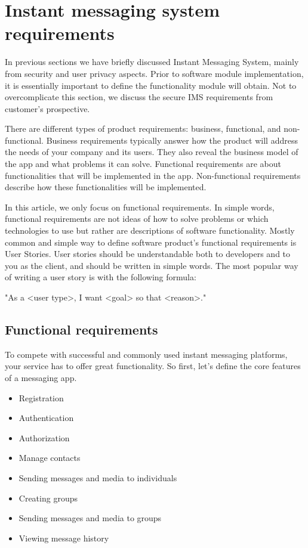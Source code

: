 \chapter{Instant messaging system requirements}\label{ch:instant-messaging-system-requirements}

In previous sections we have briefly discussed Instant Messaging System, mainly from security and user privacy aspects.
Prior to software module implementation, it is essentially important to define the functionality module will obtain.
Not to overcomplicate this section, we discuss the secure IMS requirements from customer's prospective.

There are different types of product requirements: business, functional, and non-functional.
Business requirements typically answer how the product will address the needs of your company and its users.
They also reveal the business model of the app and what problems it can solve.
Functional requirements are about functionalities that will be implemented in the app.
Non-functional requirements describe how these functionalities will be implemented.

In this article, we only focus on functional requirements.
In simple words, functional requirements are not ideas of how to solve problems or which technologies to use but rather
are descriptions of software functionality.
Mostly common and simple way to define software product's functional requirements is User Stories.
User stories should be understandable both to developers and to you as the client, and should be written in simple words.
The most popular way of writing a user story is with the following formula:

\begin{center}
    "As a <user type>, I want <goal> so that <reason>."
\end{center}


\section{Functional requirements}\label{sec:functional-requirements}
To compete with successful and commonly used instant messaging platforms, your service has to offer great functionality.
So first, let’s define the core features of a messaging app.

\begin{itemize}
    \item Registration
    \item Authentication
    \item Authorization
    \item Manage contacts
    \item Sending messages and media to individuals
    \item Creating groups
    \item Sending messages and media to groups
    \item Viewing message history
\end{itemize}

